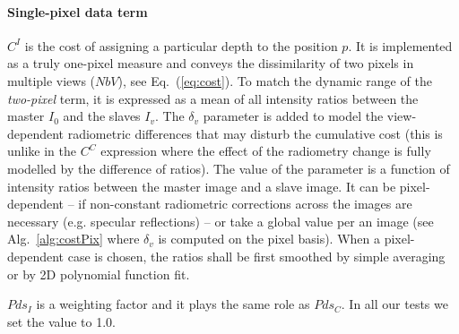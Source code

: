 \documentclass[journal]{IEEEtran}
\begin{document}
\paragraph{Single-pixel data term}
%
$C^I$ is the cost of assigning a particular depth to the position $p$. It is implemented as a truly one-pixel measure and conveys the dissimilarity of two pixels in multiple views ($NbV$), see  Eq.~(\ref{eq:cost}). To match the dynamic range of the \textit{two-pixel} term, it is expressed as a mean of all intensity ratios between the master $I_0$ and the slaves $I_v$. The $\delta_v$ parameter is added to model the view-dependent radiometric differences that may disturb the cumulative cost (this is unlike in the $C^C$ expression where the effect of the radiometry change is fully modelled by the difference of ratios). The value of the parameter is  a function of intensity ratios between the master image and a slave image. It can be pixel-dependent -- if non-constant radiometric corrections across the images are necessary (e.g. specular reflections) -- or take a global value per an image (see Alg.~\ref{alg:costPix} where $\delta_v$ is computed on the pixel basis). When a pixel-dependent case is chosen, the ratios shall be first smoothed by simple averaging or by 2D polynomial function fit. 

$Pds_{I}$ is a weighting factor and it plays the same role as $Pds_{C}$. In all our tests we set the value to 1.0.\par 
%
\end{document}
